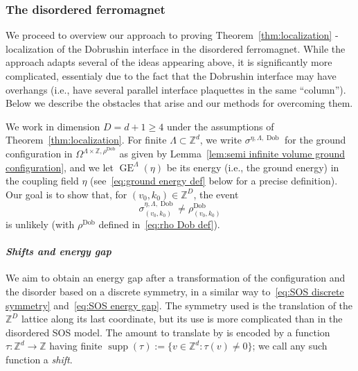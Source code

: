 \documentclass[11pt, reqno]{amsart}
\newcommand{\Z}{\mathbb{Z}}
\DeclareMathOperator{\supp}{supp}
\DeclareMathOperator{\Dob}{Dob}
\DeclareMathOperator{\GE}{GE}
\numberwithin{equation}{section}
\begin{document}
\subsubsection{The disordered ferromagnet} 
We proceed to overview 
our approach to proving Theorem~\ref{thm:localization} - localization of the Dobrushin interface in the disordered ferromagnet.
While the approach adapts several of the ideas appearing above, it is significantly more complicated, essentialy due to the fact that the Dobrushin interface may have overhangs (i.e., have several parallel interface plaquettes in the same ``column''). Below we describe the obstacles that arise and our methods for overcoming them.

We work in dimension $D=d+1\ge 4$ under the assumptions of Theorem~\ref{thm:localization}. For finite $\Lambda\subset\Z^d$, we write $\sigma^{\eta,\Lambda,\Dob}$ for the ground configuration in $\Omega^{\Lambda\times{\mathbb Z},\rho^{\Dob}}$ as given by Lemma~\ref{lem:semi infinite volume ground configuration}, and we let $\GE^\Lambda(\eta)$ be its energy (i.e., the ground energy) in the coupling field $\eta$ (see~\eqref{eq:ground energy def} below for a precise definition). Our goal is to show that, for $(v_0,k_0)\in\Z^D$, the event \begin{equation}\label{eq:excitation at v_0}
\sigma^{\eta,\Lambda,\Dob}_{(v_0,k_0)} \neq \rho^{\Dob}_{(v_0,k_0)}
\end{equation}
is unlikely (with $\rho^{\Dob}$ defined in~\eqref{eq:rho Dob def}).

\smallskip
\paragraph{\emph{Shifts and energy gap}}  
We aim to obtain an energy gap after a transformation of the configuration and the disorder based on a discrete symmetry, 
in a similar way to~\eqref{eq:SOS discrete symmetry} and~\eqref{eq:SOS energy gap}. 
The symmetry used is the translation of the $\Z^D$ lattice along its last coordinate, but its use is more complicated than in the disordered SOS model. The amount to translate by is encoded by a function~$\tau:\Z^d\to\Z$ having finite $\supp(\tau):=\{v\in\Z^d\colon \tau(v)\neq 0\}$; we call any such function a \emph{shift}.
\end{document}
